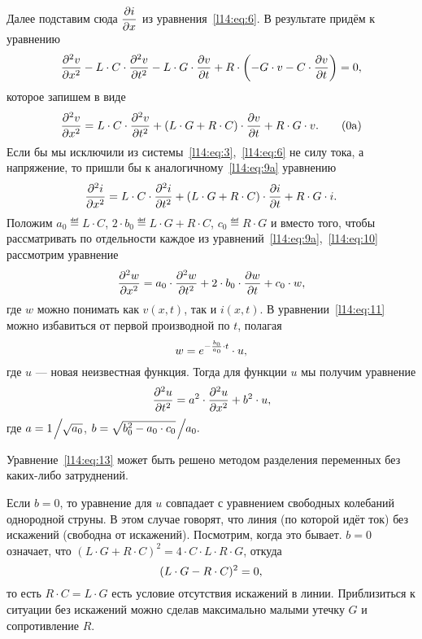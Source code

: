 Далее подставим сюда $\displaystyle\frac{\partial i}{\partial x}$ из уравнения~\eqref{l14:eq:6}. В результате придём к уравнению
\begin{equation*}
	\hfill \pdder{v}{x}-L\cdot C\cdot\pdder{v}{t}-L\cdot G\cdot \pder{v}{t}+R\cdot \left(-G\cdot v-C\cdot\pder{v}{t}\right)=0,\hfill
\end{equation*}  
которое запишем в виде
\begin{equation}\label{l14:eq:9a}
	\hfill \pdder{v}{x}=L\cdot C\cdot\pdder{v}{t}+(L\cdot G+R\cdot C)\cdot\pder{v}{t}+R\cdot G\cdot v.\tag{\theequation a}\hfill
\end{equation} 
Если бы мы исключили из системы~\eqref{l14:eq:3},~\eqref{l14:eq:6} не силу тока, а напряжение, то пришли бы к аналогичному~\eqref{l14:eq:9a} уравнению
\begin{equation}\label{l14:eq:10}
	\hfill \pdder{i}{x}=L\cdot C\cdot\pdder{i}{t}+(L\cdot G +R\cdot C)\cdot\pder{i}{t}+R\cdot G\cdot i.\hfill
\end{equation} 
Положим $a_0\eqdef L\cdot C$, $2\cdot b_0\eqdef L\cdot G +R\cdot C$, $c_0\eqdef R\cdot G$ и вместо того, чтобы рассматривать по отдельности каждое из уравнений~\eqref{l14:eq:9a},~\eqref{l14:eq:10} рассмотрим уравнение 
\begin{equation}\label{l14:eq:11}
	\hfill \pdder{w}{x}=a_0\cdot\pdder{w}{t}+2\cdot b_0\cdot\pder{w}{t}+c_0\cdot w,\hfill
\end{equation} 
где $w$ можно понимать как $v(x,t)$, так и $i(x,t)$. В уравнении~\eqref{l14:eq:11} можно избавиться от первой производной по $t$, полагая 
\begin{equation}\label{l14:eq:12}
	\hfill w=e^{-\frac{b_0}{a_0}\cdot t}\cdot u, \hfill
\end{equation}
где $u$ --- новая неизвестная функция. Тогда для функции $u$ мы получим уравнение
\begin{equation}\label{l14:eq:13}
	\hfill \pdder{u}{t}=a^2\cdot\pdder{u}{x}+b^2\cdot u,\hfill
\end{equation} 
где $a=1\!\Bigm/\!\!\sqrt{a_0}$, $b=\sqrt{b_0^2-a_0\cdot c_0}\!\Bigm/\!\!a_0.$

Уравнение~\eqref{l14:eq:13} может быть решено методом разделения переменных без каких-либо затруднений.

Если $b=0$, то уравнение для $u$ совпадает с уравнением свободных колебаний однородной струны. В этом случае говорят, что линия (по которой идёт ток) без искажений (свободна от искажений). Посмотрим, когда это бывает. $b=0$ означает, что $(L\cdot G+R\cdot C)^2=4\cdot C\cdot L\cdot R\cdot G$, откуда 
\begin{equation*}
	\hfill(L\cdot G-R\cdot C)^2=0,\hfill
\end{equation*}
то есть $R\cdot C=L\cdot G$ есть условие отсутствия искажений в линии. Приблизиться к ситуации без искажений можно сделав максимально малыми утечку $G$ и сопротивление $R$.
